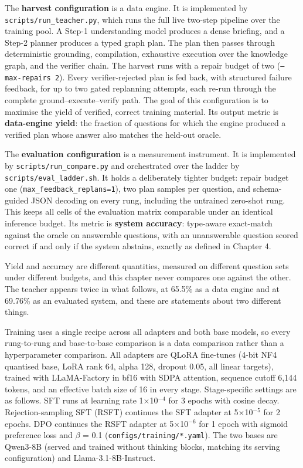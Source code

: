 \documentclass[10pt]{article} %
\begin{document}
The \textbf{harvest configuration} is a data engine. It is implemented by \texttt{scripts/run\_teacher.py},
which runs the full live two-step pipeline over the training pool. A Step-1 understanding
model produces a dense briefing, and a Step-2 planner produces a typed graph plan. The plan
then passes through deterministic grounding, compilation, exhaustive execution over the
knowledge graph, and the verifier chain. The harvest runs with a repair budget of two
(\texttt{--max-repairs 2}). Every verifier-rejected plan is fed back, with structured failure
feedback, for up to two gated replanning attempts, each re-run through the complete
ground--execute--verify path. The goal of this configuration is to maximise the yield of
verified, correct training material. Its output metric is \textbf{data-engine yield}: the fraction
of questions for which the engine produced a verified plan whose answer also matches the
held-out oracle.

The \textbf{evaluation configuration} is a measurement instrument. It is implemented by
\texttt{scripts/run\_compare.py} and orchestrated over the ladder by \texttt{scripts/eval\_ladder.sh}. It
holds a deliberately tighter budget: repair budget one (\texttt{max\_feedback\_replans=1}), two plan
samples per question, and schema-guided JSON decoding on every rung, including the untrained
zero-shot rung. This keeps all cells of the evaluation matrix comparable under an identical
inference budget. Its metric is \textbf{system accuracy}: type-aware exact-match against the oracle
on answerable questions, with an unanswerable question scored correct if and only if the
system abstains, exactly as defined in Chapter 4.

Yield and accuracy are different quantities, measured on different question sets under
different budgets, and this chapter never compares one against the other. The teacher appears
twice in what follows, at 65.5\% as a data engine and at 69.76\% as an evaluated system, and
these are statements about two different things.

Training uses a single recipe across all adapters and both base models, so every rung-to-rung
and base-to-base comparison is a data comparison rather than a hyperparameter comparison. All
adapters are QLoRA fine-tunes (4-bit NF4 quantised base, LoRA rank 64, alpha 128, dropout
0.05, all linear targets), trained with LLaMA-Factory in bf16 with SDPA attention, sequence
cutoff 6,144 tokens, and an effective batch size of 16 in every stage. Stage-specific settings
are as follows. SFT runs at learning rate 1$\times$10$^{-4}$ for 3 epochs with cosine decay.
Rejection-sampling SFT (RSFT) continues the SFT adapter at 5$\times$10$^{-5}$ for 2 epochs. DPO continues
the RSFT adapter at 5$\times$10$^{-6}$ for 1 epoch with sigmoid preference loss and $\beta$ = 0.1
(\texttt{configs/training/*.yaml}). The
two bases are Qwen3-8B (served and trained without thinking blocks, matching its serving
configuration) and Llama-3.1-8B-Instruct.
\end{document}
